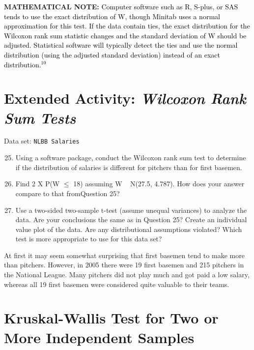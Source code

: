 \documentclass[
]{report}
\theoremstyle{definition}
\theoremstyle{definition}
\theoremstyle{definition}
\theoremstyle{definition}
\theoremstyle{remark}
\begin{document}
\large

\textbf{MATHEMATICAL NOTE:}
\textcolor{black}{Computer software such as R, S-plus, or SAS tends to use the exact distribution of W, though Minitab uses a normal approximation for this test. If the data contain ties, the exact distribution for the Wilcoxon rank sum statistic changes and the standard deviation of W should be adjusted. Statistical software will
typically detect the ties and use the normal distribution (using the adjusted standard deviation) instead of an exact distribution.$^{10}$
}

\hypertarget{extended-activity-wilcoxon-rank-sum-tests}{%
\section*{\texorpdfstring{Extended Activity: \emph{Wilcoxon Rank Sum Tests}}{Extended Activity: Wilcoxon Rank Sum Tests}}\label{extended-activity-wilcoxon-rank-sum-tests}}

Data set: \texttt{NLBB\ Salaries}

\begin{enumerate}
 \setcounter{enumi}{24}
 \item Using a software package, conduct the Wilcoxon rank sum test to determine if the distribution of salaries is different for pitchers than for first basemen.
 \item Find 2 X P(W $\leq$ 18) assuming W ~ N(27.5, 4.787). How does your answer compare to that fromQuestion 25?
 \item Use a two-sided two-sample t-test (assume unequal variances) to analyze the data. Are your conclusions the same as in Question 25? Create an individual value plot of the data. Are any distributional assumptions violated? Which test is more appropriate to use for this data set?
\end{enumerate}

\normalsize

At first it may seem somewhat surprising that first basemen tend to make more than pitchers. However, in 2005 there were 19 first basemen and 215 pitchers in the National League. Many pitchers did not play much and got paid a low salary, whereas all 19 first basemen were considered quite valuable to their teams.

\hypertarget{kruskal-wallis-test-for-two-or-more-independent-samples}{%
\section{\texorpdfstring{\textbf{Kruskal-Wallis Test for Two or More Independent Samples}}{Kruskal-Wallis Test for Two or More Independent Samples}}\label{kruskal-wallis-test-for-two-or-more-independent-samples}}
\end{document}
